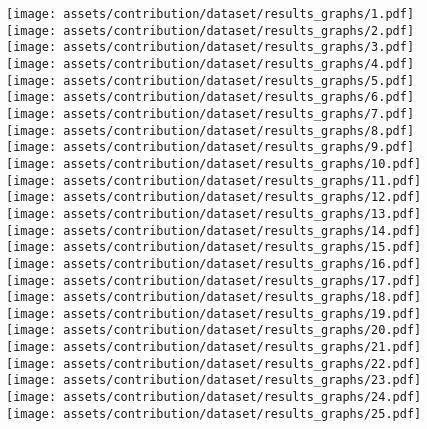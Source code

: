 \documentclass[a4paper, 12pt]{report}
\begin{document}
\begin{figure}
\centering
\vspace{20pt}
\texttt{[image: assets/contribution/dataset/results\_graphs/1.pdf]}\hfill
\texttt{[image: assets/contribution/dataset/results\_graphs/2.pdf]}\hfill
\texttt{[image: assets/contribution/dataset/results\_graphs/3.pdf]}\hfill
\texttt{[image: assets/contribution/dataset/results\_graphs/4.pdf]}\hfill
\texttt{[image: assets/contribution/dataset/results\_graphs/5.pdf]}
\\[\smallskipamount]
\texttt{[image: assets/contribution/dataset/results\_graphs/6.pdf]}\hfill
\texttt{[image: assets/contribution/dataset/results\_graphs/7.pdf]}\hfill
\texttt{[image: assets/contribution/dataset/results\_graphs/8.pdf]}\hfill
\texttt{[image: assets/contribution/dataset/results\_graphs/9.pdf]}\hfill
\texttt{[image: assets/contribution/dataset/results\_graphs/10.pdf]}
\\[\smallskipamount]
\texttt{[image: assets/contribution/dataset/results\_graphs/11.pdf]}\hfill
\texttt{[image: assets/contribution/dataset/results\_graphs/12.pdf]}\hfill
\texttt{[image: assets/contribution/dataset/results\_graphs/13.pdf]}\hfill
\texttt{[image: assets/contribution/dataset/results\_graphs/14.pdf]}\hfill
\texttt{[image: assets/contribution/dataset/results\_graphs/15.pdf]}
\\[\smallskipamount]
\texttt{[image: assets/contribution/dataset/results\_graphs/16.pdf]}\hfill
\texttt{[image: assets/contribution/dataset/results\_graphs/17.pdf]}\hfill
\texttt{[image: assets/contribution/dataset/results\_graphs/18.pdf]}\hfill
\texttt{[image: assets/contribution/dataset/results\_graphs/19.pdf]}\hfill
\texttt{[image: assets/contribution/dataset/results\_graphs/20.pdf]}
\\[\smallskipamount]
\texttt{[image: assets/contribution/dataset/results\_graphs/21.pdf]}\hfill
\texttt{[image: assets/contribution/dataset/results\_graphs/22.pdf]}\hfill
\texttt{[image: assets/contribution/dataset/results\_graphs/23.pdf]}\hfill
\texttt{[image: assets/contribution/dataset/results\_graphs/24.pdf]}\hfill
\texttt{[image: assets/contribution/dataset/results\_graphs/25.pdf]}

\end{figure}
\end{document}
